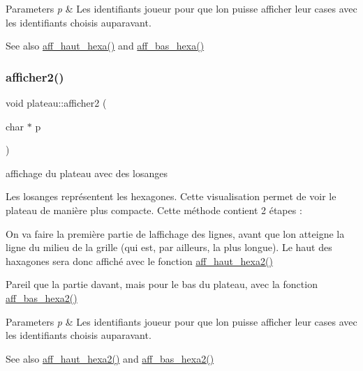 \begin{DoxyParams}{Parameters}
{\em p} & Les identifiants joueur pour que l\textquotesingle{}on puisse afficher leur cases avec les identifiants choisis auparavant. \\
\hline
\end{DoxyParams}
\begin{DoxySeeAlso}{See also}
\hyperlink{classplateau_ae9f7525df363ec9eab150e6ed312207f}{aff\+\_\+haut\+\_\+hexa()} and \hyperlink{classplateau_a9c40ed64826dc83cd9449d023121d9d7}{aff\+\_\+bas\+\_\+hexa()} 
\end{DoxySeeAlso}
\mbox{\label{classplateau_a999e3e8e2e9b4810fb42dc7e39193019}} 
\subsubsection{\texorpdfstring{afficher2()}{afficher2()}}
{\footnotesize\ttfamily void plateau\+::afficher2 (\begin{DoxyParamCaption}\item[{char $\ast$}]{p }\end{DoxyParamCaption})}



affichage du plateau avec des losanges 

Les losanges représentent les hexagones. Cette visualisation permet de voir le plateau de manière plus compacte. Cette méthode contient 2 étapes \+:
\begin{DoxyEnumerate}
\item On va faire la première partie de l\textquotesingle{}affichage des lignes, avant que l\textquotesingle{}on atteigne la ligne du milieu de la grille (qui est, par ailleurs, la plus longue). Le haut des haxagones sera donc affiché avec le fonction \hyperlink{classplateau_ab720f7c75d770bf0d6381e080e7524b1}{aff\+\_\+haut\+\_\+hexa2()}
\item Pareil que la partie d\textquotesingle{}avant, mais pour le bas du plateau, avec la fonction \hyperlink{classplateau_add9fec84a84fb5b4c101f2056fb7b6cc}{aff\+\_\+bas\+\_\+hexa2()} ~
\end{DoxyEnumerate}


\begin{DoxyParams}{Parameters}
{\em p} & Les identifiants joueur pour que l\textquotesingle{}on puisse afficher leur cases avec les identifiants choisis auparavant. \\
\hline
\end{DoxyParams}
\begin{DoxySeeAlso}{See also}
\hyperlink{classplateau_ab720f7c75d770bf0d6381e080e7524b1}{aff\+\_\+haut\+\_\+hexa2()} and \hyperlink{classplateau_add9fec84a84fb5b4c101f2056fb7b6cc}{aff\+\_\+bas\+\_\+hexa2()} 
\end{DoxySeeAlso}
\mbox{\label{classplateau_a973c415e1427c7fa427d2d8da95f5cff}} 
